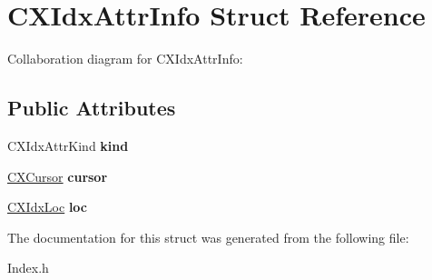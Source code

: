 \hypertarget{structCXIdxAttrInfo}{}\section{C\+X\+Idx\+Attr\+Info Struct Reference}
\label{structCXIdxAttrInfo}


Collaboration diagram for C\+X\+Idx\+Attr\+Info\+:
\subsection*{Public Attributes}
\begin{DoxyCompactItemize}
\item 
\mbox{\label{structCXIdxAttrInfo_aaa76925630efb8ae625e1f1a5b7d2139}} 
C\+X\+Idx\+Attr\+Kind {\bfseries kind}
\item 
\mbox{\label{structCXIdxAttrInfo_aba55c7d6e320345cbcc4d79609c56ac8}} 
\hyperlink{structCXCursor}{C\+X\+Cursor} {\bfseries cursor}
\item 
\mbox{\label{structCXIdxAttrInfo_a45905974b9a71d31ee7edfb9becb4c1c}} 
\hyperlink{structCXIdxLoc}{C\+X\+Idx\+Loc} {\bfseries loc}
\end{DoxyCompactItemize}


The documentation for this struct was generated from the following file\+:\begin{DoxyCompactItemize}
\item 
Index.\+h\end{DoxyCompactItemize}
